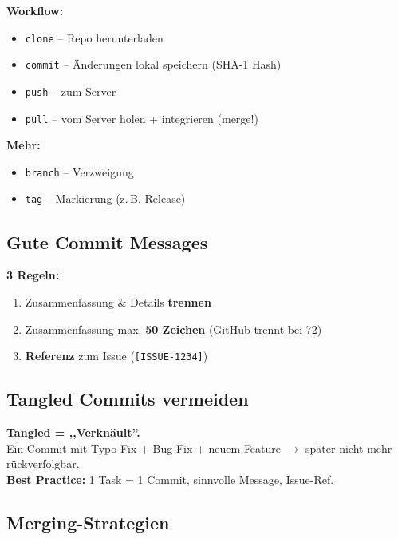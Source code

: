 \documentclass[11pt,a4paper]{article}
\begin{document}
\begin{keyfacts}
\textbf{Workflow:}
\begin{itemize}
  \item \texttt{clone} -- Repo herunterladen
  \item \texttt{commit} -- Änderungen lokal speichern (SHA-1 Hash)
  \item \texttt{push} -- zum Server
  \item \texttt{pull} -- vom Server holen + integrieren (merge!)
\end{itemize}

\textbf{Mehr:}
\begin{itemize}
  \item \texttt{branch} -- Verzweigung
  \item \texttt{tag} -- Markierung (z.\,B. Release)
\end{itemize}
\end{keyfacts}

\subsection{Gute Commit Messages}

\begin{keyfacts}
\textbf{3 Regeln:}
\begin{enumerate}
  \item Zusammenfassung \& Details \textbf{trennen}
  \item Zusammenfassung max. \textbf{50 Zeichen} (GitHub trennt bei 72)
  \item \textbf{Referenz} zum Issue (\texttt{[ISSUE-1234]})
\end{enumerate}
\end{keyfacts}

\subsection{Tangled Commits vermeiden}

\begin{story}
\textbf{Tangled = ,,Verknäult''.}\\
Ein Commit mit Typo-Fix + Bug-Fix + neuem Feature $\rightarrow$ später nicht mehr rückverfolgbar.\\
\textbf{Best Practice:} 1 Task = 1 Commit, sinnvolle Message, Issue-Ref.
\end{story}

\subsection{Merging-Strategien}
\end{document}

